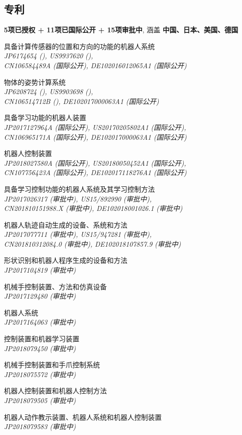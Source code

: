 \documentclass[UTF8,nofonts]{res}
\begin{document}
\begin{resume}
\section{专利}
\vspace{0.1in}
\textbf{5项已授权 + 11项已国际公开 + 15项审批中}, 涵盖 \textbf{中国、日本、美国、德国}
\begin{etaremune}
	\item 具备计算传感器的位置和方向的功能的机器人系统 {\it \\JP6174654 ({}), US9937620 ({}), \\CN106584489A (国际公开), DE102016012065A1 (国际公开)}
	\item 物体的姿势计算系统 {\it \\JP6208724 ({}), US9903698 ({}), \\CN106514712B ({}), DE102017000063A1 (国际公开)}
	\item 具备学习功能的机器人装置 {\it \\JP2017127964A (国际公开), US20170205802A1 (国际公开), \\CN106965171A (国际公开), DE102017000063A1 (国际公开)}
	\item 机器人控制装置 {\it \\JP2018027580A (国际公开), US20180050452A1 (国际公开), \\CN107756423A (国际公开), DE102017118276A1 (国际公开)}
	\item 具备学习控制功能的机器人系统及其学习控制方法 {\it \\JP2017026317 (审批中), US15/892990 (审批中), \\CN201810151988.X (审批中), DE102018001026.1 (审批中)}
	\item 机器人轨迹自动生成的设备、系统和方法 {\it \\JP2017077711 (审批中), US15/947281 (审批中),\\CN201810312084.0 (审批中), DE102018107857.9 (审批中)}
	\item 形状识别和机器人程序生成的设备和方法 {\it \\JP2017104819 (审批中)}
	\item 机械手控制装置、方法和仿真设备 {\it \\JP2017129480 (审批中)}
	\item 机器人系统 {\it \\JP2017164063 (审批中)}
	\item 控制装置和机器学习装置 {\it \\JP2018079450 (审批中)}
	\item 机械手控制装置和手爪控制系统 {\it \\JP2018075572 (审批中)}
	\item 机器人控制装置和机器人控制方法 {\it \\JP2018079505 (审批中)}
	\item 机器人动作教示装置、机器人系统和机器人控制装置 {\it \\JP2018079583 (审批中)}	
\end{etaremune}


\end{resume}
\end{document}
